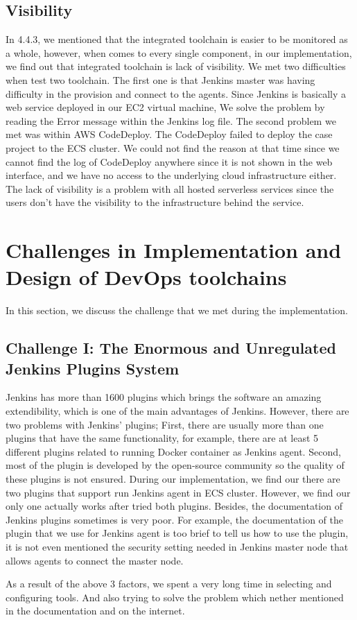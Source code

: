 \subsection{Visibility}
\label{visibility}
In 4.4.3, we mentioned that the integrated toolchain is easier to be monitored as a whole, however, when comes to every single component, in our implementation, we find out that integrated toolchain is lack of visibility. We met two difficulties when test two toolchain. The first one is that Jenkins master was having difficulty in the provision and connect to the agents. Since Jenkins is basically a web service deployed in our EC2 virtual machine, We solve the problem by reading the Error message within the Jenkins log file. The second problem we met was within AWS CodeDeploy. The CodeDeploy failed to deploy the case project to the ECS cluster. We could not find the reason at that time since we cannot find the log of CodeDeploy anywhere since it is not shown in the web interface, and we have no access to the underlying cloud infrastructure either. The lack of visibility is a problem with all hosted serverless services since the users don't have the visibility to the infrastructure behind the service.

\section{Challenges in Implementation and Design of DevOps toolchains}
In this section, we discuss the challenge that we met during the implementation. 
\subsection{Challenge I: The Enormous and Unregulated Jenkins Plugins System}
Jenkins has more than 1600 plugins which brings the software an amazing extendibility, which is one of the main advantages of Jenkins. However, there are two problems with Jenkins' plugins; First, there are usually more than one plugins that have the same functionality, for example, there are at least 5 different plugins related to running Docker container as Jenkins agent. Second, most of the plugin is developed by the open-source community so the quality of these plugins is not ensured. During our implementation, we find our there are two plugins that support run Jenkins agent in ECS cluster. However, we find our only one actually works after tried both plugins. Besides, the documentation of Jenkins plugins sometimes is very poor. For example, the documentation of the plugin that we use for Jenkins agent is too brief to tell us how to use the plugin, it is not even mentioned the security setting needed in Jenkins master node that allows agents to connect the master node. 
\par
As a result of the above 3 factors, we spent a very long time in selecting and configuring tools. And also trying to solve the problem which nether mentioned in the documentation and on the internet. 
